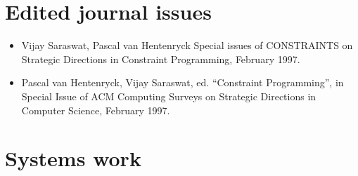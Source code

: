 \documentclass{article}
\begin{document}
\section*{Edited journal issues}
\begin{itemize}
\item  Vijay Saraswat, Pascal van Hentenryck Special issues of
  CONSTRAINTS on Strategic Directions in Constraint Programming,
  February 1997.
\item  Pascal van Hentenryck, Vijay Saraswat, ed. ``Constraint
  Programming'', in Special Issue of ACM Computing Surveys on
  Strategic Directions in Computer Science, February 1997.
\end{itemize}

\section*{Systems work}
\end{document}
